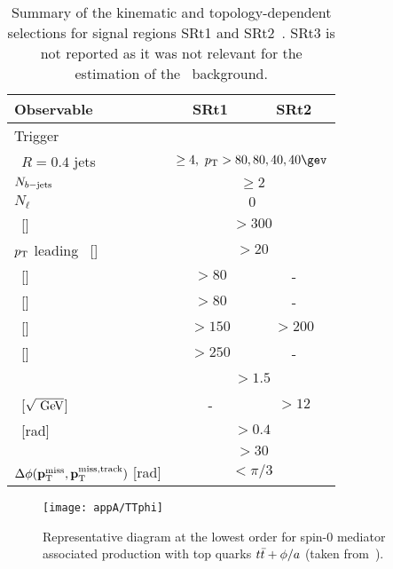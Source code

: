 		\begin{table}[!htb]
			\caption{Summary of the kinematic and topology-dependent selections for signal regions SRt1 and SRt2~\cite{DMhf}. SRt3 is not reported as it was not relevant for the estimation of the \ttZ\ background.}
			\centering
			\renewcommand{\arraystretch}{1.5}
				\begin{tabular}{lcc}
					\toprule
					\textbf{Observable}  & \textbf{SRt1} & \textbf{SRt2} \\
					\midrule
					Trigger             &   \multicolumn{2}{c}{\met}   \\
					\antikt\ $R=0.4$ jets  & \multicolumn{2}{c}{$\ge 4,~\pt>80,80,40,40 \gev$} \\
					$N_{b\mathrm{-jets}}$  & \multicolumn{2}{c}{$\geq2$} \\[0.3ex]
					$N_{\ell}$  & \multicolumn{2}{c}{$0$} \\[0.3ex]
					\midrule
					\met\ [\GeV]         &\multicolumn{2}{c}{$>300$}  \\
					$p_{\mathrm{T}}$ leading \bj\ [\GeV] &  \multicolumn{2}{c}{$>20$}   \\
					\midrule
					\mantikteightzero\ [\GeV] & $>80$ & -     \\
					\mantikteightone\ [\GeV] & $>80$ & -     \\
					\mtbmin\ [\GeV]           & $>150$ & $>200$ \\
					\mtbmax\ [\GeV]           & $>250$ & -      \\
					\drbb\    & \multicolumn{2}{c}{$>1.5$} \\
					\metsig\  [$\sqrt{\GeV}$] & - & $>12$ \\
					\midrule
					\dphimin\ [rad]     &  \multicolumn{2}{c}{$>0.4$} \\
					\mettrack [\GeV]   &  \multicolumn{2}{c}{$> 30$}  \\
					$\Delta\phi(\mathbf{p}_\mathrm{T}^\mathrm{miss},\mathbf{p}_{\mathrm{T}}^{\mathrm{miss, track}})$  [rad] & \multicolumn{2}{c}{$< \pi/3$} \\
					\bottomrule
				\end{tabular}
			\label{tab:srtselections}
		\end{table}

		\begin{wrapfigure}{R}{.33\textwidth}
			\centering\texttt{[image: appA/TTphi]}
			\caption{Representative diagram at the lowest order for spin-0 mediator associated production with top quarks $t\bar{t}+\phi/a$ (taken from~\cite{DMhf}).}
			\label{fig:dmhfModels}
		\end{wrapfigure}

